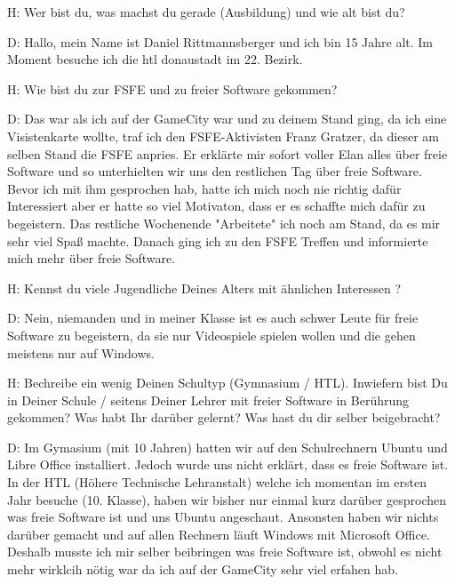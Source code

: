 

H: Wer bist du, was machst du gerade (Ausbildung) und wie alt bist du?


D: Hallo, mein Name ist Daniel Rittmannsberger und ich bin 15 Jahre alt. Im Moment besuche ich die htl donaustadt im 22. Bezirk.





H: Wie bist du zur FSFE und zu freier Software gekommen?


D: Das war als ich auf der GameCity war und zu deinem Stand ging, da ich eine Visistenkarte wollte, traf ich den FSFE-Aktivisten
   Franz Gratzer, da dieser am selben Stand die FSFE anpries. Er erklärte mir sofort voller Elan alles über freie Software und so
   unterhielten wir uns den restlichen Tag über freie Software. Bevor ich mit ihm gesprochen hab, hatte ich mich noch nie
   richtig dafür Interessiert aber er hatte so viel Motivaton, dass er es schaffte mich dafür zu begeistern. Das restliche
   Wochenende "Arbeitete" ich noch am Stand, da es mir sehr viel Spaß machte. Danach ging ich zu den FSFE Treffen und
   informierte mich mehr über freie Software.





H: Kennst du viele Jugendliche Deines Alters mit ähnlichen Interessen ?


D: Nein, niemanden und in meiner Klasse ist es auch schwer Leute für freie Software zu begeistern, da sie nur Videospiele
   spielen wollen und die gehen meistens nur auf Windows.





H: Bechreibe ein wenig Deinen Schultyp (Gymnasium / HTL). Inwiefern bist Du in Deiner Schule / seitens Deiner Lehrer 
   mit freier Software in Berührung gekommen? Was habt Ihr darüber gelernt? Was hast du dir selber beigebracht?


D: Im Gymasium (mit 10 Jahren) hatten wir auf den Schulrechnern Ubuntu und Libre Office installiert. Jedoch wurde uns nicht
   erklärt, dass es freie Software ist.
   In der HTL (Höhere Technische Lehranstalt) welche ich momentan im ersten Jahr besuche (10. Klasse), haben wir bisher nur
   einmal kurz darüber gesprochen was freie Software ist und uns Ubuntu angeschaut. Ansonsten haben wir nichts darüber gemacht und auf
   allen Rechnern läuft Windows mit Microsoft Office. Deshalb musste ich mir selber beibringen was freie Software ist, obwohl es nicht
   mehr wirklcih nötig war da ich auf der GameCity sehr viel erfahen hab.





